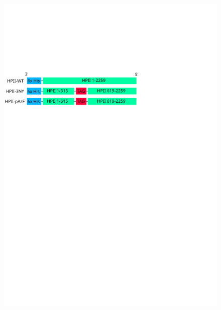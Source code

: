 \documentclass[9pt,twocolumn,twoside]{pnas-new}
\begin{document}
\begin{figure}
  \centering
  \includegraphics[width=\linewidth]{figures/gene-diagram}

\end{figure}
\end{document}
